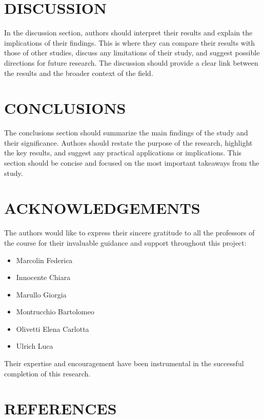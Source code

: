 \documentclass{article_saj}
\begin{document}
\section{DISCUSSION}

\indent

In the discussion section, authors should interpret their results and explain the implications of their findings. This is where they can compare their results with those of other studies, discuss any limitations of their study, and suggest possible directions for future research. The discussion should provide a clear link between the results and the broader context of the field.

\section{CONCLUSIONS}

\indent

The conclusions section should summarize the main findings of the study and their significance. Authors should restate the purpose of the research, highlight the key results, and suggest any practical applications or implications. This section should be concise and focused on the most important takeaways from the study.

\section{ACKNOWLEDGEMENTS}

\indent

The authors would like to express their sincere gratitude to all the professors of the course for their invaluable guidance and support throughout this project:

\begin{itemize}
    \item Marcolin Federica
    \item Innocente Chiara
    \item Marullo Giorgia
    \item Montrucchio Bartolomeo
    \item Olivetti Elena Carlotta
    \item Ulrich Luca
\end{itemize}

Their expertise and encouragement have been instrumental in the successful completion of this research.


\section{REFERENCES}
{\small


}
\end{document}
